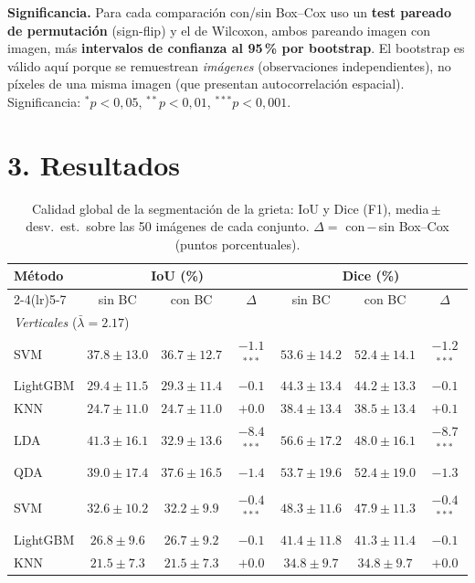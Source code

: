 \documentclass[11pt]{article}
\begin{document}
\textbf{Significancia.} Para cada comparaci\'on con/sin Box--Cox uso un \textbf{test pareado de
permutaci\'on} (sign-flip) y el de Wilcoxon, ambos pareando imagen con imagen, m\'as
\textbf{intervalos de confianza al 95\,\% por bootstrap}. El bootstrap es v\'alido aqu\'i porque
se remuestrean \emph{im\'agenes} (observaciones independientes), no p\'ixeles de una misma
imagen (que presentan autocorrelaci\'on espacial). Significancia: $^{*}p<0{,}05$,
$^{**}p<0{,}01$, $^{***}p<0{,}001$.

\section*{3. Resultados}
\begin{table}[H]\centering\small
\caption{Calidad global de la segmentaci\'on de la grieta: IoU y Dice (F1), media\,$\pm$\,desv.\ est.\ sobre las 50 im\'agenes de cada conjunto. $\Delta=$ con\,$-$\,sin Box--Cox (puntos porcentuales).}\label{tab:iou}
\begin{tabular}{l ccc ccc}
\toprule
M\'etodo & \multicolumn{3}{c}{IoU (\%)} & \multicolumn{3}{c}{Dice (\%)} \\
\cmidrule(lr){2-4}\cmidrule(lr){5-7}
 & sin BC & con BC & $\Delta$ & sin BC & con BC & $\Delta$ \\
\midrule
\multicolumn{7}{l}{\textit{Verticales} ($\bar\lambda=2.17$)} \\
\quad SVM & $37.8\pm13.0$ & $36.7\pm12.7$ & $-1.1$$^{***}$ & $53.6\pm14.2$ & $52.4\pm14.1$ & $-1.2$$^{***}$ \\
\quad LightGBM & $29.4\pm11.5$ & $29.3\pm11.4$ & $-0.1$ & $44.3\pm13.4$ & $44.2\pm13.3$ & $-0.1$ \\
\quad KNN & $24.7\pm11.0$ & $24.7\pm11.0$ & $+0.0$ & $38.4\pm13.4$ & $38.5\pm13.4$ & $+0.1$ \\
\quad LDA & $41.3\pm16.1$ & $32.9\pm13.6$ & $-8.4$$^{***}$ & $56.6\pm17.2$ & $48.0\pm16.1$ & $-8.7$$^{***}$ \\
\quad QDA & $39.0\pm17.4$ & $37.6\pm16.5$ & $-1.4$ & $53.7\pm19.6$ & $52.4\pm19.0$ & $-1.3$ \\
\addlinespace
\multicolumn{7}{l}{\textit{Horizontales} ($\bar\lambda=1.73$)} \\
\quad SVM & $32.6\pm10.2$ & $32.2\pm9.9$ & $-0.4$$^{***}$ & $48.3\pm11.6$ & $47.9\pm11.3$ & $-0.4$$^{***}$ \\
\quad LightGBM & $26.8\pm9.6$ & $26.7\pm9.2$ & $-0.1$ & $41.4\pm11.8$ & $41.3\pm11.4$ & $-0.1$ \\
\quad KNN & $21.5\pm7.3$ & $21.5\pm7.3$ & $+0.0$ & $34.8\pm9.7$ & $34.8\pm9.7$ & $+0.0$ \\

\end{tabular}
\end{table}
\end{document}
